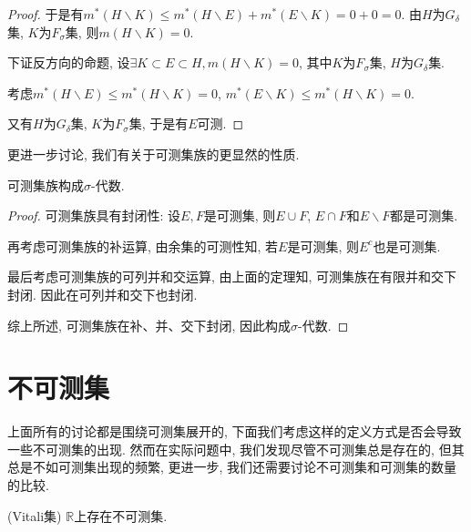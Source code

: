 \documentclass[theorem=false,mathfont=none,openany,sub3section]{easybook}
\begin{document}
\begin{proof}
  于是有$m^{*}(H\backslash K)\leqslant m^{*}(H\backslash E)+m^{*}(E\backslash K)=0+0=0$. 由$H$为$G_{\delta}$集, $K$为$F_{\sigma}$集, 则$m(H\backslash K)=0$.\par
  下证反方向的命题, 设$\exists K\subset E\subset H, m(H\backslash K)=0$, 其中$K$为$F_{\sigma}$集, $H$为$G_{\delta}$集.\par
  考虑$m^{*}(H\backslash E)\leqslant m^{*}(H\backslash K)=0$, $m^{*}(E\backslash K)\leqslant m^{*}(H\backslash K)=0$.\par
  又有$H$为$G_{\delta}$集, $K$为$F_{\sigma}$集, 于是有$E$可测.\par
\end{proof}

更进一步讨论, 我们有关于可测集族的更显然的性质.\par

\begin{theorem}
  可测集族构成$\sigma$-代数.\par
\end{theorem}

\begin{proof}
  可测集族具有封闭性: 设$E,F$是可测集, 则$E\cup F$, $E\cap F$和$E\backslash F$都是可测集.\par
  再考虑可测集族的补运算, 由余集的可测性知, 若$E$是可测集, 则$E^c$也是可测集.\par
  最后考虑可测集族的可列并和交运算, 由上面的定理知, 可测集族在有限并和交下封闭. 因此在可列并和交下也封闭.\par
  综上所述, 可测集族在补、并、交下封闭, 因此构成$\sigma$-代数.\par
\end{proof}

\newpage

\section{不可测集}

上面所有的讨论都是围绕可测集展开的, 下面我们考虑这样的定义方式是否会导致一些不可测集的出现. 然而在实际问题中, 我们发现尽管不可测集总是存在的, 但其总是不如可测集出现的频繁, 更进一步, 我们还需要讨论不可测集和可测集的数量的比较.\par

\begin{theorem}
  (Vitali集) $\mathbb{R}$上存在不可测集.\par
\end{theorem}
\end{document}
